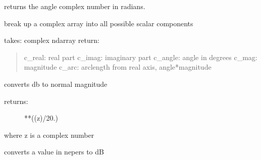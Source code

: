\documentclass[letterpaper,10pt,english]{sphinxmanual}
\begin{document}
\begin{fulllineitems}
\label{api/mwavepy:mwavepy.mathFunctions.complex_2_radian}
returns the angle complex number in radians.

\end{fulllineitems}


\begin{fulllineitems}
\label{api/mwavepy:mwavepy.mathFunctions.complex_components}
break up a complex array into all possible scalar components

takes: complex ndarray 
return:
\begin{quote}

c\_real: real part
c\_imag: imaginary part
c\_angle: angle in degrees
c\_mag:  magnitude
c\_arc:  arclength from real axis, angle*magnitude
\end{quote}

\end{fulllineitems}


\begin{fulllineitems}
\label{api/mwavepy:mwavepy.mathFunctions.db_2_magnitude}
converts db to normal magnitude
\begin{description}
\item[{returns:}] **((z)/20.)

\end{description}

where z is a complex number

\end{fulllineitems}


\begin{fulllineitems}
\label{api/mwavepy:mwavepy.mathFunctions.db_2_np}
converts a value in nepers to dB

\end{fulllineitems}
\end{document}
